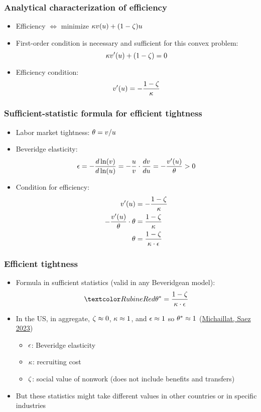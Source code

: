 \documentclass[11pt,aspectratio=169,xcolor={dvipsnames},hyperref={pdftex,pdfpagemode=UseNone,hidelinks,pdfdisplaydoctitle=true},usepdftitle=false]{beamer}
\begin{document}
\begin{frame}
\frametitle{Analytical characterization of efficiency}
\begin{itemize}
\item Efficiency $\Leftrightarrow$ minimize $\kappa v(u) + (1-\zeta) u$
\item First-order condition is necessary and sufficient for this convex problem:
\begin{equation*}
\kappa v'(u) + (1-\zeta) =0 
\end{equation*}
\item Efficiency condition:
\begin{equation*}
v'(u)  = - \frac{1 - \zeta}{\kappa} 
\end{equation*}
\end{itemize}
\end{frame}

\begin{frame}
\frametitle{Sufficient-statistic formula for efficient tightness}
\begin{itemize}
\item Labor market tightness: $\theta = v/u$	
\item Beveridge elasticity: 
\begin{equation*}
\e = -\oe{v}{u} = - \frac{u}{v}\cdot\od{v}{u} = - \frac{v'(u)}{\t}>0
\end{equation*}
\item Condition for efficiency:
\begin{align*}
v'(u) &= -\frac{1 - \zeta}{\kappa}\\
-\frac{v'(u)}{\theta} \cdot\theta & =  \frac{1 - \zeta}{\kappa}\\
\theta  &=  \frac{1 - \zeta}{\kappa \cdot \epsilon}
\end{align*}
\end{itemize}
\end{frame}

\begin{frame}
\frametitle{Efficient tightness}
\begin{itemize}
\item Formula in sufficient statistics (valid in any Beveridgean model):
\begin{equation*}
\al{\t^* = \frac{1 - \z}{\k \cdot \e}}
\end{equation*}
\item In the US, in aggregate, $\zeta \approx 0$, $\kappa\approx 1$, and $\epsilon\approx 1$ so $\theta^*\approx 1$ (\href{https://pascalmichaillat.org/13/}{Michaillat, Saez 2023})
\begin{itemize}
\item $\epsilon$: Beveridge elasticity
\item $\kappa$: recruiting cost
\item $\zeta$: social value of nonwork (does not include benefits and transfers)
\end{itemize}
\item But these statistics might take different values in other countries or in specific industries 
\end{itemize}	
\end{frame}
\end{document}
